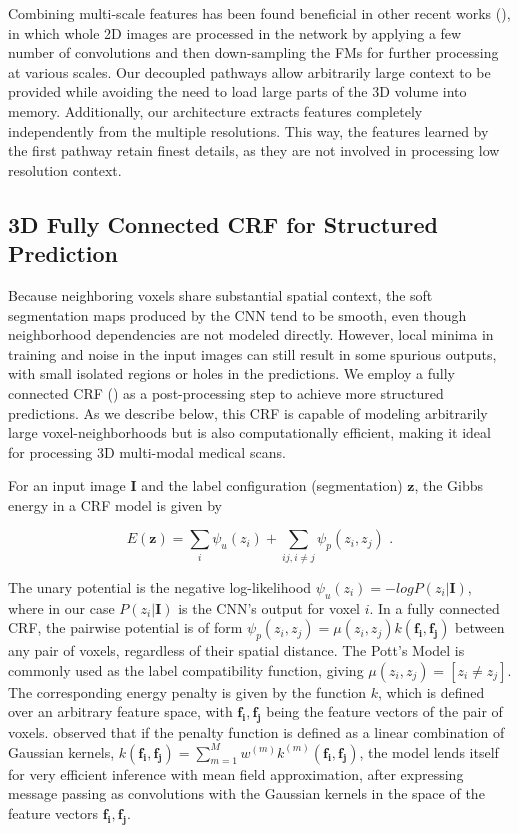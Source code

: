 \documentclass[preprint,authoryear,12pt]{elsarticle}
\newcommand{\eqfs}{\textrm{ .}}
\begin{document}
Combining multi-scale features has been found beneficial in other recent works (\cite{Long2014, Ronneberger2015}), in which whole 2D images are processed in the network by applying a few number of convolutions and then down-sampling the FMs for further processing at various scales. Our decoupled pathways allow arbitrarily large context to be provided while avoiding the need to load large parts of the 3D volume into memory. Additionally, our architecture extracts features completely independently from the multiple resolutions. This way, the features learned by the first pathway retain finest details, as they are not involved in processing low resolution context.

\subsection{3D Fully Connected CRF for Structured Prediction}
\label{subsec:3dFcCrf}

Because neighboring voxels share substantial spatial context, the soft segmentation maps produced by the CNN tend to be smooth, even though neighborhood dependencies are not modeled directly. However, local minima in training and noise in the input images can still result in some spurious outputs, with small isolated regions or holes in the predictions. We employ a fully connected CRF (\cite{Krahenbuhl2013}) as a post-processing step to achieve more structured predictions. As we describe below, this CRF is capable of modeling arbitrarily large voxel-neighborhoods but is also computationally efficient, making it ideal for processing 3D multi-modal medical scans.

For an input image $\mathbf{I}$ and the label configuration (segmentation) $\mathbf{z}$, the Gibbs energy in a CRF model is given by

\begin{equation}
E(\mathbf{z}) = \sum_i{\psi_u(z_i)} + \sum_{ij, i \neq j}{\psi_p(z_i,z_j)} \eqfs
\end{equation}

The unary potential is the negative log-likelihood $\psi_u(z_i) = -logP(z_i|\mathbf{I})$, where in our case $P(z_i|\mathbf{I})$ is the CNN's output for voxel $i$. In a fully connected CRF, the pairwise potential is of form $\psi_p(z_i,z_j) = \mu(z_i,z_j) k(\mathbf{f_i},\mathbf{f_j})$ between any pair of voxels, regardless of their spatial distance. The Pott's Model is commonly used as the label compatibility function, giving $\mu(z_i,z_j)=[z_i \neq z_j]$. The corresponding energy penalty is given by the function $k$, which is defined over an arbitrary feature space, with $\mathbf{f_i},\mathbf{f_j}$ being the feature vectors of the pair of voxels. \cite{Krahenbuhl2013} observed that if the penalty function is defined as a linear combination of Gaussian kernels, $k(\mathbf{f_i},\mathbf{f_j}) = \sum_{m=1}^{M} {w^{(m)}k^{(m)}(\mathbf{f_i},\mathbf{f_j})}$, the model lends itself for very efficient inference with mean field approximation, after expressing message passing as convolutions with the Gaussian kernels in the space of the feature vectors $\mathbf{f_i},\mathbf{f_j}$.
\end{document}
